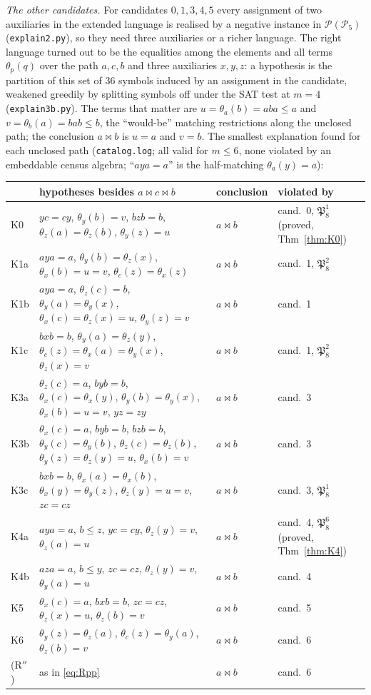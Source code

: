 \documentclass[11pt]{amsart}
\theoremstyle{definition}
\renewcommand{\P}{\mathcal{P}}
\newcommand{\mt}{\bowtie}   %
\begin{document}
\smallskip
\emph{The other candidates.} For candidates $0,1,3,4,5$ every assignment of two auxiliaries in the extended language is realised by a negative instance in $\P(\P_5)$ (\texttt{explain2.py}), so they need three auxiliaries or a richer language. The right language turned out to be the equalities among the elements and all terms $\theta_p(q)$ over the path $a,c,b$ and three auxiliaries $x,y,z$: a hypothesis is the partition of this set of $36$ symbols induced by an assignment in the candidate, weakened greedily by splitting symbols off under the SAT test at $m=4$ (\texttt{explain3b.py}). The terms that matter are $u=\theta_a(b)=aba\le a$ and $v=\theta_b(a)=bab\le b$, the ``would-be'' matching restrictions along the unclosed path; the conclusion $a\mt b$ is $u=a$ and $v=b$. The smallest explanation found for each unclosed path (\texttt{catalog.log}; all valid for $m\le6$, none violated by an embeddable census algebra; ``$aya=a$'' is the half-matching $\theta_a(y)=a$):
\begin{center}\small
\begin{tabular}{@{}llll@{}}
\toprule
& hypotheses besides $a\mt c\mt b$ & conclusion & violated by\\
\midrule
K0 & $yc=cy$, $\theta_y(b)=v$, $bzb=b$, $\theta_z(a)=\theta_z(b)$, $\theta_y(z)=u$ & $a\mt b$ & cand.\ 0, $\mathfrak P_8^1$ (proved, Thm~\ref{thm:K0})\\
K1a & $aya=a$, $\theta_y(b)=\theta_z(x)$, $\theta_x(b)=u=v$, $\theta_c(z)=\theta_x(z)$ & $a\mt b$ & cand.\ 1, $\mathfrak P_8^2$\\
K1b & $aya=a$, $\theta_z(c)=b$, $\theta_y(a)=\theta_y(x)$, $\theta_x(c)=\theta_z(x)=u$, $\theta_y(z)=v$ & $a\mt b$ & cand.\ 1\\
K1c & $bxb=b$, $\theta_y(a)=\theta_z(y)$, $\theta_c(z)=\theta_x(a)=\theta_y(x)$, $\theta_z(x)=v$ & $a\mt b$ & cand.\ 1, $\mathfrak P_8^2$\\
K3a & $\theta_z(c)=a$, $byb=b$, $\theta_x(c)=\theta_x(y)$, $\theta_y(b)=\theta_y(x)$, $\theta_x(b)=u=v$, $yz=zy$ & $a\mt b$ & cand.\ 3\\
K3b & $\theta_x(c)=a$, $byb=b$, $bzb=b$, $\theta_y(c)=\theta_y(b)$, $\theta_z(c)=\theta_z(b)$, $\theta_y(z)=\theta_z(y)=u$, $\theta_x(b)=v$ & $a\mt b$ & cand.\ 3\\
K3c & $bxb=b$, $\theta_x(a)=\theta_x(b)$, $\theta_x(y)=\theta_y(z)$, $\theta_z(y)=u=v$, $zc=cz$ & $a\mt b$ & cand.\ 3, $\mathfrak P_8^1$\\
K4a & $aya=a$, $b\le z$, $yc=cy$, $\theta_z(y)=v$, $\theta_z(a)=u$ & $a\mt b$ & cand.\ 4, $\mathfrak P_8^6$ (proved, Thm~\ref{thm:K4})\\
K4b & $aza=a$, $b\le y$, $zc=cz$, $\theta_z(y)=v$, $\theta_y(a)=u$ & $a\mt b$ & cand.\ 4\\
K5 & $\theta_x(c)=a$, $bxb=b$, $zc=cz$, $\theta_z(x)=u$, $\theta_z(b)=v$ & $a\mt b$ & cand.\ 5\\
K6 & $\theta_y(z)=\theta_z(a)$, $\theta_c(z)=\theta_y(a)$, $\theta_z(b)=v$ & $a\mt b$ & cand.\ 6\\
(R$''$) & as in \eqref{eq:Rpp} & $a\mt b$ & cand.\ 6\\
\bottomrule
\end{tabular}
\end{center}
\end{document}
